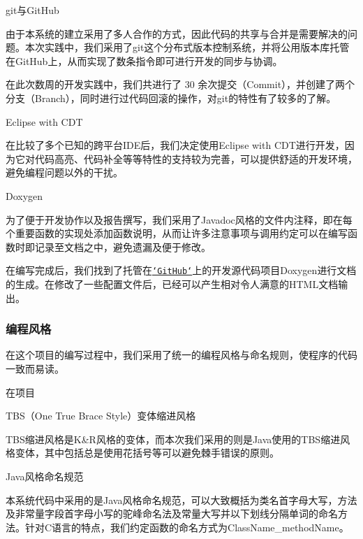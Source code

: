 \begin{DoxyEnumerate}
\item {\ttfamily git}与{\ttfamily Git\-Hub}

由于本系统的建立采用了多人合作的方式，因此代码的共享与合并是需要解决的问题。本次实践中，我们采用了{\ttfamily git}这个分布式版本控制系统，并将公用版本库托管在{\ttfamily Git\-Hub}上，从而实现了数条指令即可进行开发的同步与协调。

在此次数周的开发实践中，我们共进行了 30 余次提交（{\ttfamily Commit}），并创建了两个分支（{\ttfamily Branch}），同时进行过代码回滚的操作，对{\ttfamily git}的特性有了较多的了解。
\item {\ttfamily Eclipse with C\-D\-T}

在比较了多个已知的跨平台{\ttfamily I\-D\-E}后，我们决定使用{\ttfamily Eclipse with C\-D\-T}进行开发，因为它对代码高亮、代码补全等等特性的支持较为完善，可以提供舒适的开发环境，避免编程问题以外的干扰。
\item {\ttfamily Doxygen}

为了便于开发协作以及报告撰写，我们采用了{\ttfamily Javadoc}风格的文件内注释，即在每个重要函数的实现处添加函数说明，从而让许多注意事项与调用约定可以在编写函数时即记录至文档之中，避免遗漏及便于修改。

在编写完成后，我们找到了托管在\href{https://github.com/doxygen/doxygen}{\tt `\-Git\-Hub`}上的开发源代码项目{\ttfamily Doxygen}进行文档的生成。在修改了一些配置文件后，已经可以产生相对令人满意的{\ttfamily H\-T\-M\-L}文档输出。
\end{DoxyEnumerate}

\subsubsection*{编程风格}

在这个项目的编写过程中，我们采用了统一的编程风格与命名规则，使程序的代码一致而易读。

在项目


\begin{DoxyEnumerate}
\item {\-T\-B\-S}（\-One True Brace Style）变体缩进风格

{\-T\-B\-S}缩进风格是{\ttfamily K\&R}风格的变体，而本次我们采用的则是{\ttfamily Java}使用的{\-T\-B\-S}缩进风格变体，其中包括总是使用花括号等可以避免棘手错误的原则。
\item {\ttfamily Java}风格命名规范

本系统代码中采用的是{\ttfamily Java}风格命名规范，可以大致概括为类名首字母大写，方法及非常量字段首字母小写的驼峰命名法及常量大写并以下划线分隔单词的命名方法。针对{\ttfamily C}语言的特点，我们约定函数的命名方式为{\ttfamily Class\-Name\-\_\-method\-Name}。
\end{DoxyEnumerate}

